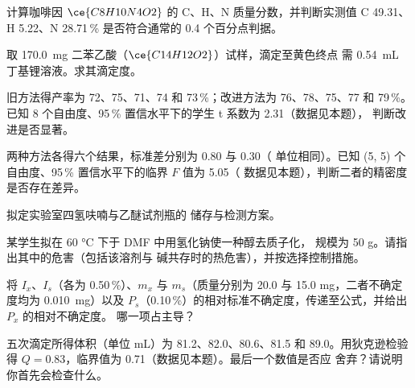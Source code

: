 \begin{exercise}[$\star\star$]\label{exo:b3:lab-techniques-3:5}
计算咖啡因 $\ce{C8H10N4O2}$ 的 C、H、N 质量分数，并判断实测值
C 49.31、H 5.22、N 28.71\,\% 是否符合通常的 0.4 个百分点判据。
\end{exercise}

\begin{exercise}[$\star\star$]\label{exo:b3:lab-techniques-3:6}
取 \qty{170.0}{mg} 二苯乙酸（$\ce{C14H12O2}$）试样，滴定至黄色终点
需 \qty{0.54}{mL} 丁基锂溶液。求其滴定度。
\end{exercise}

\begin{exercise}[$\star\star$]\label{exo:b3:lab-techniques-3:7}
旧方法得产率为 72、75、71、74 和 73\,\%；改进方法为 76、78、75、77 和
79\,\%。已知 8 个自由度、95\,\% 置信水平下的学生 t 系数为 2.31（数据见本题），
判断改进是否显著。
\end{exercise}

\begin{exercise}[$\star\star$]\label{exo:b3:lab-techniques-3:8}
两种方法各得六个结果，标准差分别为 0.80 与 0.30（
单位相同）。已知 (5, 5) 个自由度、95\,\% 置信水平下的临界 $F$ 值为 5.05（
数据见本题），判断二者的精密度是否存在差异。
\end{exercise}

\begin{exercise}[$\star\star$]\label{exo:b3:lab-techniques-3:9}
拟定实验室四氢呋喃与乙醚试剂瓶的
储存与检测方案。
\end{exercise}

\begin{exercise}[$\star\star\star$]\label{exo:b3:lab-techniques-3:10}
某学生拟在 60 °C 下于 DMF 中用氢化钠使一种醇去质子化，
规模为 50 g。请指出其中的危害（包括该溶剂与
碱共存时的热危害），并按选择控制措施。
\end{exercise}

\begin{exercise}[$\star\star\star$]\label{exo:b3:lab-techniques-3:11}
将 $I_x$、$I_s$（各为 0.50\,\%）、$m_x$ 与 $m_s$（质量分别为 20.0
与 15.0 mg，二者不确定度均为 \qty{0.010}{mg}）以及 $P_s$（0.10\,\%）的相对标准不确定度，传递至公式，并给出 $P_x$ 的相对不确定度。
哪一项占主导？
\end{exercise}

\begin{exercise}[$\star\star\star$]\label{exo:b3:lab-techniques-3:12}
五次滴定所得体积（单位 mL）为 81.2、82.0、80.6、81.5 和 89.0。用狄克逊检验得
$Q = 0.83$，临界值为 0.71（数据见本题）。最后一个数值是否应
舍弃？请说明你首先会检查什么。
\end{exercise}


